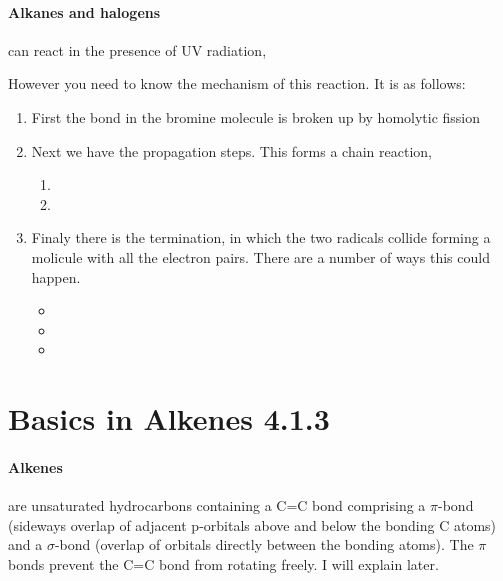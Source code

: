 \documentclass[11pt,a4paper]{memoir}
\begin{document}
	\paragraph{Alkanes and halogens} can react in the presence of UV radiation,
	\begin{center}
	\end{center}
	However you need to know the mechanism of this reaction. It is as follows:
	\begin{enumerate}
		\item First the bond in the bromine molecule is broken up by homolytic fission 
		\item Next we have the propagation steps. This forms a chain reaction,
		\begin{enumerate}
			\item {}
			\item {}
		\end{enumerate}
		\item Finaly there is the termination, in which the two radicals collide forming a molicule with all the electron pairs. There are a number of ways this could happen.
		\begin{itemize}
			\item {}
			\item {}
			\item {}
		\end{itemize}
	\end{enumerate}
	
\section{Basics in Alkenes 4.1.3}

	\paragraph{Alkenes} are unsaturated hydrocarbons containing a C=C bond comprising a $\pi$-bond (sideways overlap of adjacent p-orbitals above and below the bonding C atoms) and a $\sigma$-bond (overlap of orbitals directly between the bonding atoms). The $\pi$ bonds prevent the C=C bond from rotating freely. I will explain later.
	
\end{document}
